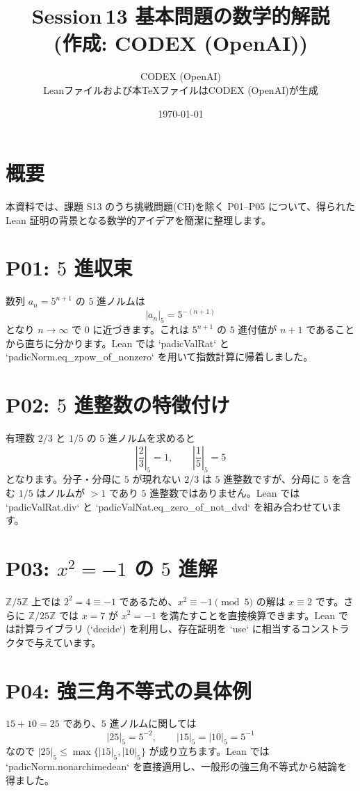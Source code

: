 \documentclass[12pt]{ltjsarticle}
\title{Session\,13 基本問題の数学的解説\\\large (作成: CODEX (OpenAI))}
\author{CODEX (OpenAI)\\\small Leanファイルおよび本TeXファイルはCODEX (OpenAI)が生成}
\date{\today}
\begin{document}
\maketitle

\section*{概要}
本資料では、課題 S13 のうち挑戦問題(CH)を除く P01--P05 について、得られた Lean 証明の背景となる数学的アイデアを簡潔に整理します。

\section{P01: $5$ 進収束}
数列 $a_n = 5^{n+1}$ の $5$ 進ノルムは
\[
  \lvert a_n \rvert_5 = 5^{-(n+1)}
\]
となり $n \to \infty$ で $0$ に近づきます。これは $5^{n+1}$ の $5$ 進付値が $n+1$ であることから直ちに分かります。Lean では `padicValRat` と `padicNorm.eq_zpow_of_nonzero` を用いて指数計算に帰着しました。

\section{P02: $5$ 進整数の特徴付け}
有理数 $2/3$ と $1/5$ の $5$ 進ノルムを求めると
\[
  \left|\frac{2}{3}\right|_5 = 1, \qquad \left|\frac{1}{5}\right|_5 = 5
\]
となります。分子・分母に $5$ が現れない $2/3$ は $5$ 進整数ですが、分母に $5$ を含む $1/5$ はノルムが $>1$ であり $5$ 進整数ではありません。Lean では `padicValRat.div` と `padicValNat.eq_zero_of_not_dvd` を組み合わせています。

\section{P03: $x^2 = -1$ の $5$ 進解}
$\mathbb{Z}/5\mathbb{Z}$ 上では $2^2 = 4 \equiv -1$ であるため、$x^2 \equiv -1 \pmod{5}$ の解は $x \equiv 2$ です。さらに $\mathbb{Z}/25\mathbb{Z}$ では $x = 7$ が $x^2 = -1$ を満たすことを直接検算できます。Lean では計算ライブラリ (`decide`) を利用し、存在証明を `use` に相当するコンストラクタで与えています。

\section{P04: 強三角不等式の具体例}
$15 + 10 = 25$ であり、$5$ 進ノルムに関しては
\[
  \lvert 25 \rvert_5 = 5^{-2}, \qquad \lvert 15 \rvert_5 = \lvert 10 \rvert_5 = 5^{-1}
\]
なので $\lvert 25 \rvert_5 \le \max\{\lvert 15 \rvert_5, \lvert 10 \rvert_5\}$ が成り立ちます。Lean では `padicNorm.nonarchimedean` を直接適用し、一般形の強三角不等式から結論を得ました。
\end{document}

